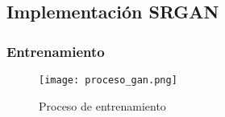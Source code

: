 \subsection{Implementación SRGAN}

\subsubsection{Entrenamiento}

\begin{figure}[H]
    \begin{center}
      \texttt{[image: proceso\_gan.png]}
      \caption{Proceso de entrenamiento}
      \label{Alexis4}
    \end{center}
\end{figure}